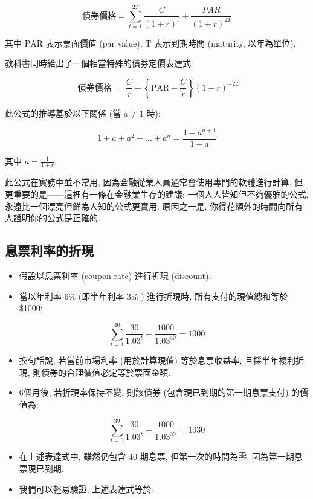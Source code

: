 \documentclass[letterpaper]{article}
\begin{document}
		$$
		\text {債券價格}=\sum_{t=1}^{2 T} \frac{C}{ (1+r) ^{t}}+\frac{P A R}{ (1+r) ^{2 T}}
		$$
		
		其中 \(\mathrm{PAR}\) 表示票面價值 (par value), \(\mathrm{T}\) 表示到期時間 (maturity, 以年為單位).
		
		教科書同時給出了一個相當特殊的債券定價表達式: 
		
		$$
		\text { 債券價格 }=\frac{C}{r}+\left\{\mathrm{PAR}-\frac{C}{r}\right\} (1+r) ^{-2 T}
		$$
		
		此公式的推導基於以下關係 (當 \( a \neq 1 \) 時): 
		
		\[
		1 + a + a^{2} + \ldots + a^{n} = \frac{1 - a^{n+1}}{1 - a}
		\]
		
		其中 \( a = \frac{1}{1 + r} \).  
		
		此公式在實務中並不常用, 因為金融從業人員通常會使用專門的軟體進行計算.    
		但更重要的是——這裡有一條在金融業生存的建議:  一個人人皆知但不夠優雅的公式, 永遠比一個漂亮但鮮為人知的公式更實用.  原因之一是, 你得花額外的時間向所有人證明你的公式是正確的.  
		
		
		\subsection{息票利率的折現}
		
		\begin{itemize}
			\item 假設以息票利率 (coupon rate) 進行折現  (discount).  
			\item 當以年利率 \(6\%\)  (即半年利率 \(3\%\) ) 進行折現時, 所有支付的現值總和等於 \$1000: 
		\end{itemize}
		
		$$
		\sum_{t=1}^{40} \frac{30}{1.03^{t}}+\frac{1000}{1.03^{40}}=1000
		$$
		
		\begin{itemize}
			\item 換句話說, 若當前市場利率 (用於計算現值) 等於息票收益率, 且採半年複利折現, 則債券的合理價值必定等於票面金額.  
			\item 6個月後, 若折現率保持不變, 則該債券 (包含現已到期的第一期息票支付) 的價值為: 
		\end{itemize}
		
		
		$$
		\sum_{t=0}^{39} \frac{30}{1.03^{t}}+\frac{1000}{1.03^{39}}=1030
		$$
		
		\begin{itemize}
			\item 在上述表達式中, 雖然仍包含 40 期息票, 但第一次的時間為零, 因為第一期息票現已到期.  
			\item 我們可以輕易驗證, 上述表達式等於: 
		\end{itemize}
		
\end{document}
